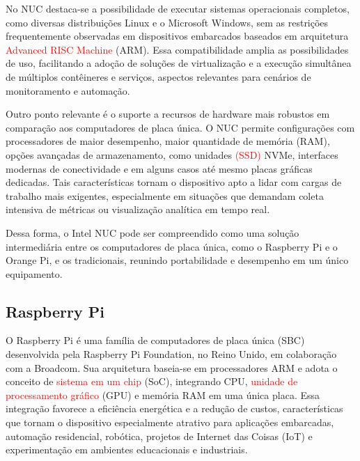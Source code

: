 No NUC destaca-se a possibilidade de executar sistemas operacionais completos, como diversas distribuições Linux e o Microsoft Windows, sem as restrições frequentemente observadas em dispositivos embarcados baseados em arquitetura \textcolor{red}{Advanced RISC Machine} (ARM). Essa compatibilidade amplia as possibilidades de uso, facilitando a adoção de soluções de virtualização e a execução simultânea de múltiplos contêineres e serviços, aspectos relevantes para cenários de monitoramento e automação.

Outro ponto relevante é o suporte a recursos de hardware mais robustos em comparação aos computadores de placa única. O NUC permite configurações com processadores de maior desempenho, maior quantidade de memória \textcolor{red}{} (RAM), opções avançadas de armazenamento, como unidades \textcolor{red}{ (SSD)} NVMe, interfaces modernas de conectividade e em alguns casos até mesmo placas gráficas dedicadas. Tais características tornam o dispositivo apto a lidar com cargas de trabalho mais exigentes, especialmente em situações que demandam coleta intensiva de métricas ou visualização analítica em tempo real.

Dessa forma, o Intel NUC pode ser compreendido como uma solução intermediária entre os computadores de placa única, como o Raspberry Pi e o Orange Pi, e os  tradicionais, reunindo portabilidade e desempenho em um único equipamento.

\subsection{Raspberry Pi}
\label{subsection:RaspberryPi}

O Raspberry Pi \citep{raspihw2025} é uma família de computadores de placa única (SBC) desenvolvida pela Raspberry Pi Foundation, no Reino Unido, em colaboração com a Broadcom. Sua arquitetura baseia-se em processadores ARM e adota o conceito de \textcolor{red}{sistema em um chip} (SoC), integrando CPU, \textcolor{red}{unidade de processamento gráfico} (GPU) e memória RAM em uma única placa. Essa integração favorece a eficiência energética e a redução de custos, características que tornam o dispositivo especialmente atrativo para aplicações embarcadas, automação residencial, robótica, projetos de Internet das Coisas (IoT) e experimentação em ambientes educacionais e industriais.

